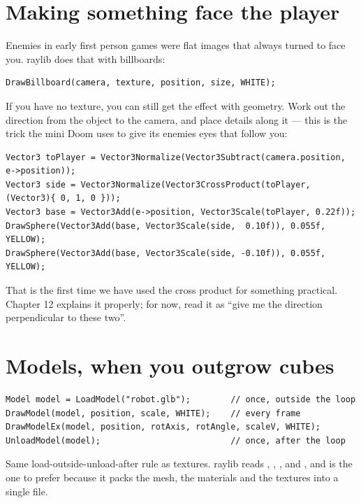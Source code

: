\section{Making something face the player}

Enemies in early first person games were flat images that always turned to face
you. raylib does that with billboards:

\begin{lstlisting}
DrawBillboard(camera, texture, position, size, WHITE);
\end{lstlisting}

If you have no texture, you can still get the effect with geometry. Work out the
direction from the object to the camera, and place details along it --- this is
the trick the mini Doom uses to give its enemies eyes that follow you:

\begin{lstlisting}
Vector3 toPlayer = Vector3Normalize(Vector3Subtract(camera.position, e->position));
Vector3 side = Vector3Normalize(Vector3CrossProduct(toPlayer, (Vector3){ 0, 1, 0 }));
Vector3 base = Vector3Add(e->position, Vector3Scale(toPlayer, 0.22f));
DrawSphere(Vector3Add(base, Vector3Scale(side,  0.10f)), 0.055f, YELLOW);
DrawSphere(Vector3Add(base, Vector3Scale(side, -0.10f)), 0.055f, YELLOW);
\end{lstlisting}

That is the first time we have used the cross product for something practical.
Chapter 12 explains it properly; for now, read it as ``give me the direction
perpendicular to these two''.

\section{Models, when you outgrow cubes}

\begin{lstlisting}
Model model = LoadModel("robot.glb");        // once, outside the loop
DrawModel(model, position, scale, WHITE);    // every frame
DrawModelEx(model, position, rotAxis, rotAngle, scaleV, WHITE);
UnloadModel(model);                          // once, after the loop
\end{lstlisting}

Same load-outside-unload-after rule as textures. raylib reads ,
, ,  and , and  is the
one to prefer because it packs the mesh, the materials and the textures into a
single file.


